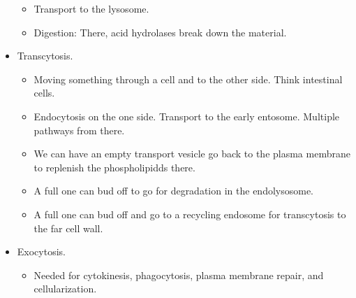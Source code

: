 \documentclass[../notes.tex]{subfiles}
\begin{document}
\begin{itemize}
\begin{itemize}
        \item Transport to the lysosome.
        \item Digestion: There, acid hydrolases break down the material.
    \end{itemize}
    \item Transcytosis.
    \begin{itemize}
        \item Moving something through a cell and to the other side. Think intestinal cells.
        \item Endocytosis on the one side. Transport to the early entosome. Multiple pathways from there.
        \item We can have an empty transport vesicle go back to the plasma membrane to replenish the phospholipidds there.
        \item A full one can bud off to go for degradation in the endolysosome.
        \item A full one can bud off and go to a recycling endosome for transcytosis to the far cell wall.
    \end{itemize}
    \item Exocytosis.
    \begin{itemize}
        \item Needed for cytokinesis, phagocytosis, plasma membrane repair, and cellularization.
    \end{itemize}
\end{itemize}
\end{document}
